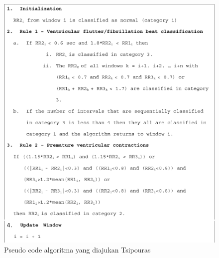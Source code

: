 \begin{figure}[htbp]
	\centering
	\includegraphics[scale=0.8]{images/algo_detect.png}
	\caption{Pseudo code algoritma yang diajukan Tsipouras}
	\label{algo:aritmia_rule}
\end{figure}